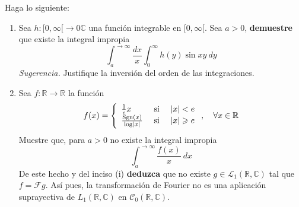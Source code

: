 \documentclass[12pt]{report}
\theoremstyle{largebreak}
\renewcommand{\geq}{\ensuremath{\geqslant}}
\newcommand\abs[1]{\ensuremath{\left|#1\right|}}
\newcommand\cf[3]{\ensuremath{#1:#2\rightarrow#3}}
\newcommand{\fou}[1]{\ensuremath{\mathcal{F}#1}}
\newcommand{\Sgn}[1]{\ensuremath{\textup{Sgn}\left(#1\right)}}
\begin{document}
    \begin{excer}
        Haga lo siguiente:
        \begin{enumerate}
            \item Sea $\cf{h}{[0,\infty[}{0\mathbb{C}}$ una función integrable en $[0,\infty[$. Sea $a>0$, \textbf{demuestre} que existe la integral impropia
            \begin{equation*}
                \int_{a}^{ \rightarrow\infty}\frac{dx}{x}\int_0^{\infty}h(y)\sin xy\:dy
            \end{equation*}
            \textit{Sugerencia.} Justifique la inversión del orden de las integraciones.
            \item Sea $\cf{f}{\mathbb{R}}{\mathbb{R}}$ la función
            \begin{equation*}
                f(x)=\left\{
                    \begin{array}{lcr}
                        \frac{1}{e}x & \textup{ si } & \abs{x}<e\\
                        \frac{\Sgn{x}}{\log\abs{x}} & \textup{ si } & \abs{x}\geq e\\
                    \end{array}
                \right.,\quad\forall x\in\mathbb{R}
            \end{equation*}
            Muestre que, para $a>0$ no existe la integral impropia
            \begin{equation*}
                \int_a^{\rightarrow \infty}\frac{f(x)}{x}\:dx
            \end{equation*}
            De este hecho y del inciso (i) \textbf{deduzca} que no existe $g\in\mathcal{L}_1(\mathbb{R},\mathbb{C})$ tal que $f=\fou{g}$. Así pues, la transformación de Fourier no es una aplicación suprayectiva de $L_1(\mathbb{R},\mathbb{C})$ en $\mathcal{C}_0(\mathbb{R},\mathbb{C})$.
        \end{enumerate}
    \end{excer}

    \begin{sol}
        
    \end{sol}
\end{document}
